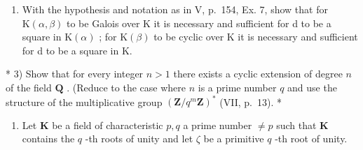 \begin{enumerate}
\def\labelenumi{\alph{enumi})}
\setcounter{enumi}{2}
\tightlist
\item
  With the hypothesis and notation as in V, p.~154, Ex. 7, show that for \(\mathrm{K}(\alpha,\beta)\) to be Galois over K it is necessary and sufficient for d to be a square in \(\mathrm{K}(\alpha)\) ; for \(\mathrm{K}(\beta)\) to be cyclic over K it is necessary and sufficient for d to be a square in K.
\end{enumerate}

* 3) Show that for every integer \(n > 1\) there exists a cyclic extension of degree \(n\) of the field \(\mathbf{Q}\) . (Reduce to the case where \(n\) is a prime number \(q\) and use the structure of the multiplicative group \((\mathbf{Z} / q^m\mathbf{Z})^*\) (VII, p.~13). *

\begin{enumerate}
\def\labelenumi{\arabic{enumi})}
\setcounter{enumi}{3}
\tightlist
\item
  Let \(\mathbf{K}\) be a field of characteristic \(p, q\) a prime number \(\neq p\) such that \(\mathbf{K}\) contains the \(q\) -th roots of unity and let \(\zeta\) be a primitive \(q\) -th root of unity.
\end{enumerate}

